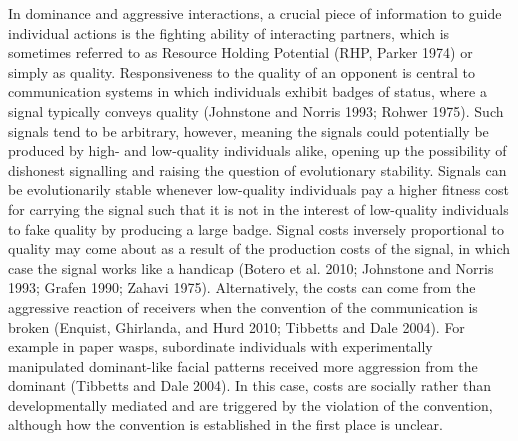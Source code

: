 \documentclass[
  12pt,
]{article}
\begin{document}
In dominance and aggressive interactions, a crucial piece of information
to guide individual actions is the fighting ability of interacting
partners, which is sometimes referred to as Resource Holding Potential
(RHP, Parker 1974) or simply as quality. Responsiveness to the quality
of an opponent is central to communication systems in which individuals
exhibit badges of status, where a signal typically conveys quality
(Johnstone and Norris 1993; Rohwer 1975). Such signals tend to be
arbitrary, however, meaning the signals could potentially be produced by
high- and low-quality individuals alike, opening up the possibility of
dishonest signalling and raising the question of evolutionary stability.
Signals can be evolutionarily stable whenever low-quality individuals
pay a higher fitness cost for carrying the signal such that it is not in
the interest of low-quality individuals to fake quality by producing a
large badge. Signal costs inversely proportional to quality may come
about as a result of the production costs of the signal, in which case
the signal works like a handicap (Botero et al. 2010; Johnstone and
Norris 1993; Grafen 1990; Zahavi 1975). Alternatively, the costs can
come from the aggressive reaction of receivers when the convention of
the communication is broken (Enquist, Ghirlanda, and Hurd 2010; Tibbetts
and Dale 2004). For example in paper wasps, subordinate individuals with
experimentally manipulated dominant-like facial patterns received more
aggression from the dominant (Tibbetts and Dale 2004). In this case,
costs are socially rather than developmentally mediated and are
triggered by the violation of the convention, although how the
convention is established in the first place is unclear.
\end{document}
